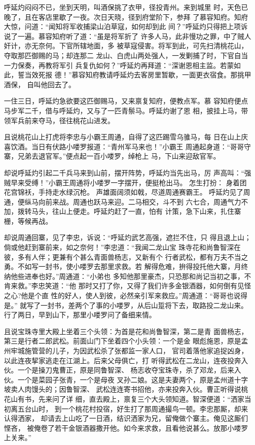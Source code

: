 呼延灼闷闷不已，坐到天明，叫酒保挑了衣甲，径投青州。来到城里
时，天色已晚了，且在客店里歇了一夜。次日天晓，径到府堂阶下，参拜
了慕容知府。知府大惊，问道：“闻知将军收捕梁山泊草寇，如何却到此
间？”呼延灼只得把上项诉说了一遍。慕容知府听了道：“虽是将军折了
许多人马，此非慢功之罪，中了贼人奸计，亦无奈何。下官所辖地面，多
被草寇侵害。将军到此，可先扫清桃花山，夺取那匹御赐的马；却连那二
龙山、白虎山两处强人，一发剿捕了时，下官自当一力保奏，再教将军引
兵复仇如何？”呼延灼再拜道：“深谢恩相主监。若蒙如此，誓当效死报
德！”慕容知府教请呼延灼去客房里暂歇，一面更衣宿食。那挑甲酒保，
自叫他回去了。

一住三日，呼延灼急欲要这匹御赐马，又来禀复知府，便教点军。慕
容知府便点马步军二千，借与呼延灼，又与了一匹青鬃马。呼延灼谢了恩
相，披挂上马，带领军兵前来夺马，径往桃花山进发。

且说桃花山上打虎将李忠与小霸王周通，自得了这匹踢雪乌骓马，每
日在山上庆喜饮酒。当日有伏路小喽罗报道：“青州军马来也！”小霸王
周通起身道：“哥哥守寨，兄弟去退官军。”便点起一百小喽罗，绰枪上
马，下山来迎敌官军。

却说呼延灼引起二千兵马来到山前，摆开阵势，呼延灼当先出马，厉
声高叫：“强贼早来受缚！”小霸王周通将小喽罗一字摆开，便挺枪出马。
怎生打扮：
身着团花宫锦袄，手持走水绿沉枪。
声雄面阔须如戟，尽道周通赛霸王。
呼延灼见了周通，便纵马向前来战。周通也跃马来迎。二马相交，斗不到
六七合，周通气力不加，拨转马头，往山上便走。呼延灼赶了一直，怕有
计策，急下山来，扎住寨栅，等候再战。

却说周通回寨，见了李忠，诉说：“呼延灼武艺高强，遮拦不住，只
得且退上山；倘或他赶到寨前来，如之奈何！”李忠道：“我闻二龙山宝
珠寺花和尚鲁智深在彼，多有人伴；更兼有个甚么青面兽杨志，又新有个
行者武松，都有万夫不当之勇。不如写一封书，使小喽罗去那里求救。若
解得危难，拚得投托他大寨，月终纳他些进奉也好。”周通道：“小弟也
多知他那里豪杰，只恐那和尚记当初之事，不肯来救。”李忠笑道：“他
那时又打了你，又得了我们许多金银酒器，如何倒有见怪之心?他是个直
性的好人，使人到彼，必然亲引军来救应。”周通道：“哥哥也说得是。”
就写了一封书，差两个了事的小喽罗，从后山踅将下去，取路投二龙山来。
行了两日，早到山下，那里小喽罗问了备细来情。

且说宝珠寺里大殿上坐着三个头领：为首是花和尚鲁智深，第二是青
面兽杨志，第三是行者二郎武松。前面山门下坐着四个小头领：一个是金
眼彪施恩，原是孟州牢城施管营的儿子，为因武松杀了张都监一家人口，
官司着落他家追捉凶身，以此连夜挈家逃走在江湖上。后来父母俱亡，打
听得武松在二龙山，连夜投奔入伙。一个是操刀鬼曹正，原是同鲁智深、
杨志收夺宝珠寺，杀了邓龙，后来入伙。一个是菜园子张青，一个是母夜
叉孙二娘。这是夫妻两个，原是孟州道十字坡卖人肉馒头的；因鲁智深、
武松连连寄书招他，亦来投奔入伙。曹正听得说桃花山有书，先来问了详
细，直去殿上，禀复三个大头领知道。智深便道：“洒家当初离五台山时，
到一个桃花村投宿，好生打了那周通撮鸟一顿。李忠那厮，却来认得洒家，
却请去上山吃了一日酒，结识洒家为兄，留俺做个寨主。俺见这厮们悭吝，
被俺卷了若干金银酒器撒开他。如今来求救，且看他说甚么。放那小喽罗
上关来。”

